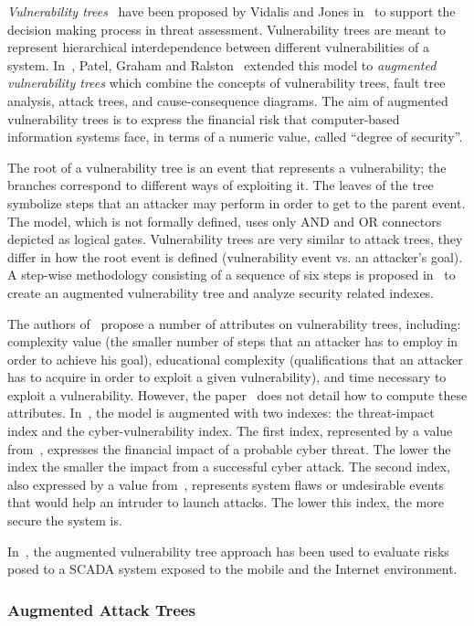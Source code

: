 \documentclass[a4paper]{article}
\begin{document}
\emph{Vulnerability trees}~\cite{ViJo} have been proposed by Vidalis and Jones
in~ to support the decision making process in threat assessment.
Vulnerability trees are meant to represent  hierarchical interdependence between
different  vulnerabilities of a system. In~, Patel, Graham and
Ralston~\cite{PaGrRa} extended this model to \emph{augmented vulnerability
trees} which combine the concepts of vulnerability trees, fault tree analysis,
attack trees, and cause-consequence diagrams. The aim of augmented vulnerability
trees is to express the financial risk that computer-based information systems
face, in terms of a numeric value, called ``degree of security''.

The root of a vulnerability tree is an event that represents a vulnerability;
the branches correspond to different ways of exploiting it. The leaves of the
tree symbolize steps that an attacker may perform in order to get to the parent
event. The model, which is not formally defined, uses only AND and OR connectors
depicted as logical gates. Vulnerability trees are very similar to attack trees,
they differ in how the root event is defined (vulnerability event vs. an
attacker's goal). A step-wise methodology consisting of a sequence of six steps
is proposed in~\cite{PaGrRa} to create an augmented vulnerability tree
and analyze security related indexes.

The authors of~\cite{ViJo} propose a number of attributes on vulnerability
trees, including: complexity value (the smaller number of steps that an attacker
has to employ in order to achieve his goal), educational complexity
(qualifications that an attacker has to acquire in order to exploit a given
vulnerability), and time necessary to exploit a vulnerability. However, the
paper~\cite{ViJo} does not detail how to compute these attributes.
In~\cite{PaGrRa}, the model is augmented with two indexes: the threat-impact
index and the cyber-vulnerability index. The first index, represented by a value
from~, expresses the financial impact of a probable cyber threat. The
lower the index the smaller the impact from a successful cyber attack. The
second index, also expressed by a value from~, represents system flaws
or undesirable events that would help an intruder to launch attacks. The lower
this index, the more secure the system is.

In~\cite{TaJo}, the augmented vulnerability tree approach has been used to
evaluate risks posed to a SCADA system exposed to the mobile and the Internet 
environment.

\subsubsection{Augmented Attack Trees} 
\label{sec:augmented_attack_trees}
\end{document}
